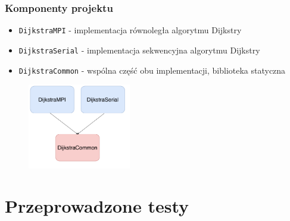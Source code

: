 \documentclass[10pt]{beamer}
\begin{document}
\begin{frame}
\frametitle{Komponenty projektu}
\begin{itemize}
\item \lstinline{DijkstraMPI} - implementacja równoległa algorytmu Dijkstry
\item \lstinline{DijkstraSerial} - implementacja sekwencyjna algorytmu Dijkstry
\item \lstinline{DijkstraCommon} - wspólna część obu implementacji, biblioteka statyczna
\end{itemize}
\begin{figure}
\centering
\includegraphics[width=0.4\textwidth]{static/DijkstraArch1.pdf}
\end{figure}

\end{frame}

\section{Przeprowadzone testy}
\end{document}
